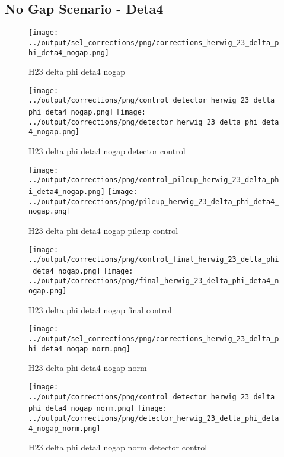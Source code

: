\documentclass[11pt]{book}
\begin{document}
\clearpage
\subsection{No Gap Scenario - Deta4}
\begin{figure}[ht]
\centering
\texttt{[image: ../output/sel\_corrections/png/corrections\_herwig\_23\_delta\_phi\_deta4\_nogap.png]}
\caption{H23 delta phi deta4 nogap}
\label{fig:H23_delta_phi_deta4_nogap}
\end{figure}

\begin{figure}[ht]
\centering
\texttt{[image: ../output/corrections/png/control\_detector\_herwig\_23\_delta\_phi\_deta4\_nogap.png]}
\texttt{[image: ../output/corrections/png/detector\_herwig\_23\_delta\_phi\_deta4\_nogap.png]}
\caption{H23 delta phi deta4 nogap detector control}
\label{fig:H23_delta_phi_deta4_nogap_detector_control}
\end{figure}

\begin{figure}[ht]
\centering
\texttt{[image: ../output/corrections/png/control\_pileup\_herwig\_23\_delta\_phi\_deta4\_nogap.png]}
\texttt{[image: ../output/corrections/png/pileup\_herwig\_23\_delta\_phi\_deta4\_nogap.png]}
\caption{H23 delta phi deta4 nogap pileup control}
\label{fig:H23_delta_phi_deta4_nogap_pileup_control}
\end{figure}


\begin{figure}[ht]
\centering
\texttt{[image: ../output/corrections/png/control\_final\_herwig\_23\_delta\_phi\_deta4\_nogap.png]}
\texttt{[image: ../output/corrections/png/final\_herwig\_23\_delta\_phi\_deta4\_nogap.png]}
\caption{H23 delta phi deta4 nogap final control}
\label{fig:H23_delta_phi_deta4_nogap_final_control}
\end{figure}


\begin{figure}[ht]
\centering
\texttt{[image: ../output/sel\_corrections/png/corrections\_herwig\_23\_delta\_phi\_deta4\_nogap\_norm.png]}
\caption{H23 delta phi deta4 nogap norm}
\label{fig:H23_delta_phi_deta4_nogap_norm}
\end{figure}

\begin{figure}[ht]
\centering
\texttt{[image: ../output/corrections/png/control\_detector\_herwig\_23\_delta\_phi\_deta4\_nogap\_norm.png]}
\texttt{[image: ../output/corrections/png/detector\_herwig\_23\_delta\_phi\_deta4\_nogap\_norm.png]}
\caption{H23 delta phi deta4 nogap norm detector control}
\label{fig:H23_delta_phi_deta4_nogap_norm_detector_control}
\end{figure}
\end{document}
